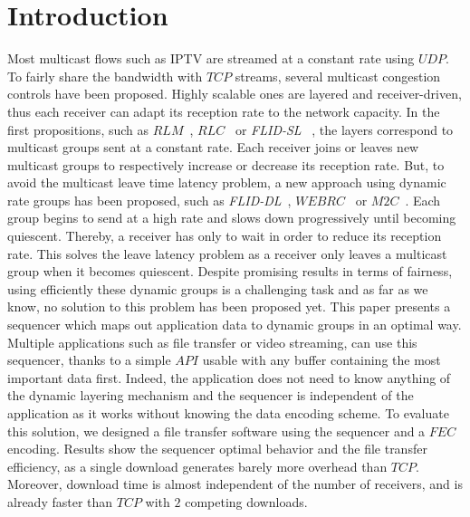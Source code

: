 \documentclass[a4paper]{article}
\begin{document}
\section{Introduction}
    Most multicast flows such as IPTV are streamed at a constant rate using
    $UDP$.  To fairly share the bandwidth with $TCP$ streams, several multicast
    congestion controls have been proposed. Highly scalable ones are layered and
    receiver-driven, thus each receiver can adapt its reception rate to the
    network capacity.  In the first propositions, such as
    $RLM$~\cite{mccanne_receiver-driven_1996},
    $RLC$~\cite{vicisano_tcp-like_1998} or
    \textit{FLID-SL}~\cite{byers_flid-dl:_2002} , the layers correspond to
    multicast groups sent at a constant rate.  Each receiver joins or leaves new
    multicast groups to respectively increase or decrease its reception rate.
    But, to avoid the multicast leave time latency problem, a new approach using
    dynamic rate groups has been proposed, such as
    \textit{FLID-DL}~\cite{byers_flid-dl:_2002}, $WEBRC$~\cite{luby_wave_2002}
    or $M2C$~\cite{lucas_fair_2009}.  Each group begins to send at a high rate
    and slows down progressively until becoming quiescent. Thereby, a receiver
    has only to wait in order to reduce its reception rate. This solves the
    leave latency problem as a receiver only leaves a multicast group when it
    becomes quiescent.  Despite promising results in terms of fairness, using
    efficiently these dynamic groups is a challenging task and as far as we
    know, no solution to this problem has been proposed yet.
This paper presents a sequencer which maps out application data to dynamic
    groups in an optimal way.  Multiple applications such as file transfer or
    video streaming, can use this sequencer, thanks to a simple $API$ usable
    with any buffer containing the most important data first. Indeed, the
    application does not need to know anything of the dynamic layering
    mechanism and the sequencer is independent of the application as it works
    without knowing the data encoding scheme.
To evaluate this solution, we designed a file transfer software using the
    sequencer and a $FEC$ encoding.  Results show the sequencer optimal behavior
    and the file transfer efficiency, as a single download generates barely more
    overhead than $TCP$.  Moreover, download time is almost independent of the
    number of receivers, and is already faster than $TCP$ with $2$ competing
    downloads.
\end{document}
